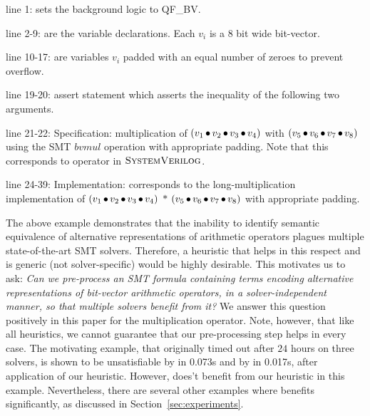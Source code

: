 \noindent line 1: sets the background logic to QF\_BV.

\noindent line 2-9: are the variable declarations. Each  $v_i$ is a 8 bit wide bit-vector.

\noindent line 10-17: are variables $v_i$ padded with an equal number of zeroes to prevent overflow.

\noindent line 19-20: assert statement which asserts the inequality of the following two arguments.

\noindent line 21-22: Specification: multiplication of $(v_1 \mathop{\bullet} v_2 \mathop{\bullet} v_3 \mathop{\bullet} v_4)$ with $(v_5 \mathop{\bullet} v_6 \mathop{\bullet} v_7 \mathop{\bullet} v_8)$ using the SMT $bvmul$ operation with appropriate padding. Note that this corresponds to {\tt *} operator in $\textsc{SystemVerilog}$.

\noindent line 24-39: Implementation: corresponds to the long-multiplication implementation of $(v_1 \mathop{\bullet} v_2 \mathop{\bullet} v_3 \mathop{\bullet} v_4)$ $*$ $(v_5 \mathop{\bullet} v_6 \mathop{\bullet} v_7 \mathop{\bullet} v_8)$ with appropriate padding.

\vspace{0.2 cm}
The above example demonstrates that the inability to identify semantic
equivalence of alternative representations of arithmetic operators
plagues multiple state-of-the-art SMT solvers.  Therefore, a heuristic
that helps in this respect and is generic (not solver-specific) would
be highly desirable.  This motivates us to ask: \emph{Can we
pre-process an SMT formula containing terms encoding alternative
representations of bit-vector arithmetic operators, in a
solver-independent manner, so that multiple solvers benefit from it?}
We answer this question positively in this paper for the
multiplication operator.  Note, however, that like all heuristics, we
cannot guarantee that our pre-processing step helps in every case.
The motivating example, that originally timed out after $24$ hours on
three solvers, is shown to be unsatisfiable by {\zthree} in 0.073s and
by {\cvcfour} in 0.017s, after application of our heuristic. However,
{\boolector} does't benefit from our heuristic in this example.
Nevertheless, there are several other examples where {\boolector}
benefits significantly, as discussed in Section~\ref{sec:experiments}.

